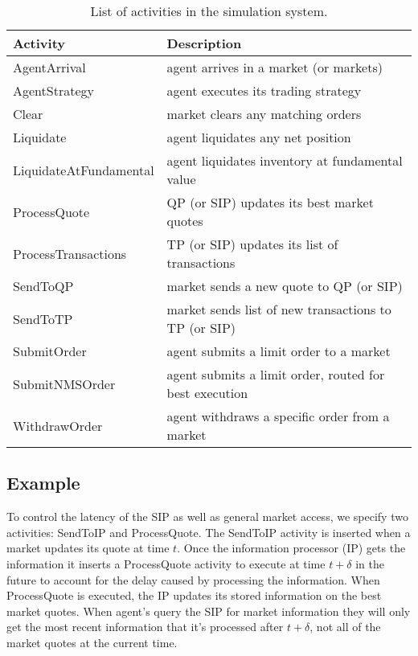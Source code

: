 \documentclass[11pt]{article}
\begin{document}
\begin{table}
\centering
\begin{tabular}{l l} \toprule
\textbf{Activity} 	& \textbf{Description} \\ \midrule
\textsf{AgentArrival} 	& agent arrives in a market (or markets) \\
\textsf{AgentStrategy} 	& agent executes its trading strategy \\
\textsf{Clear} 		& market clears any matching orders \\
\textsf{Liquidate}	& agent liquidates any net position \\
\textsf{LiquidateAtFundamental}   & agent liquidates inventory at fundamental value \\
\textsf{ProcessQuote} 	& QP (or SIP) updates its best market quotes \\
\textsf{ProcessTransactions}  & TP (or SIP) updates its list of transactions \\
\textsf{SendToQP} 	& market sends a new quote to QP (or SIP) \\
\textsf{SendToTP}   & market sends list of new transactions to TP (or SIP) \\
\textsf{SubmitOrder} 	& agent submits a limit order to a market \\
\textsf{SubmitNMSOrder} 	& agent submits a limit order, routed for best execution \\
\textsf{WithdrawOrder} 	& agent withdraws a specific order from a market \\ \bottomrule
\end{tabular}
\caption{List of activities in the simulation system.}
\label{tab:activity}
\end{table}

\subsection{Example}

To control the latency of the SIP as well as general market access, we specify
two activities: \textsf{SendToIP} and \textsf{ProcessQuote}.  The
\textsf{SendToIP} activity is inserted when a market updates its quote at time
$t$. Once the information processor (IP) gets the information it inserts a
\textsf{ProcessQuote} activity to execute at time $t + \delta$ in the future to
account for the delay caused by processing the information.
%
When \textsf{ProcessQuote} is executed, the IP updates its stored information on
the best market quotes. When agent's query the SIP for market information they
will only get the most recent information that it's processed after $t+\delta$,
not all of the market quotes at the current time.
\end{document}
